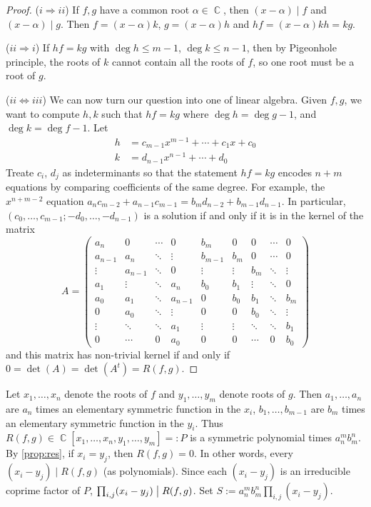 \documentclass[11pt, a4paper]{memoir}
\DeclareMathOperator{\C}{{\mathbb{C}}}
\newcommand{\imp}[2]{($#1\Rightarrow#2$)\hspace{0.2cm}}
\newcommand{\impe}[2]{($#1\Leftrightarrow#2$)\hspace{0.2cm}}
\renewcommand{\div}{\bigm|}
\theoremstyle{change}
\theoremstyle{plain}
\theoremstyle{nonumberplain}
\newtheorem{proof}{Proof}
\numberwithin{equation}{section}
\begin{document}
\begin{proof}
    \imp{i}{ii} If $f,g$ have a common root $\alpha\in\C$, then $(x-\alpha)\mid f$ and $(x-\alpha)\mid g$.
    Then $f=(x-\alpha)k$, $g=(x-\alpha)h$ and $hf=(x-\alpha)kh=kg$.

    \imp{ii}{i} If $hf=kg$ with $\deg h\leq m-1$, $\deg k\leq n-1$, then by Pigeonhole principle, the roots of $k$ cannot contain all the roots of $f$, so one root must be a root of $g$.

    \impe{ii}{iii} We can now turn our question into one of linear algebra.
    Given $f,g$, we want to compute $h,k$ such that $hf=kg$ where $\deg h=\deg g-1$, and $\deg k =\deg f-1$.
    Let
    \begin{align*}
        h&=c_{m-1}x^{m-1}+\cdots+c_1x+c_0\\
        k&=d_{n-1}x^{n-1}+\cdots+d_0
    \end{align*}
    Treate $c_i$, $d_j$ as indeterminants so that the statement $hf=kg$ encodes $n+m$ equations by comparing coefficients of the same degree.
    For example, the $x^{n+m-2}$ equation $a_nc_{m-2}+a_{n-1}c_{m-1}=b_md_{n-2}+b_{m-1}d_{n-1}$.
    In particular, $(c_0,\ldots,c_{m-1};-d_0,\ldots,-d_{n-1})$ is a solution if and only if it is in the kernel of the matrix
    \begin{equation*}
        A=
        \begin{pmatrix}
            a_n&0&\cdots&0&b_m&0&0&\cdots&0\\
            a_{n-1}&a_n&\ddots&\vdots&b_{m-1}&b_m&0&\cdots&0\\
            \vdots&a_{n-1}&\ddots&0&\vdots&\vdots&b_m&\ddots&\vdots\\
            a_1&\vdots&\ddots&a_n&b_0&b_1&\vdots&\ddots&0\\
            a_0&a_1&\ddots&a_{n-1}&0&b_0&b_1&\ddots&b_m\\
            0&a_0&\ddots&\vdots&0&0&b_0&\ddots&\vdots\\
            \vdots&\ddots&\ddots&a_1&\vdots&\vdots&\ddots&\ddots&b_1\\
            0&\cdots&0&a_0&0&0&\cdots&0&b_0
        \end{pmatrix}
    \end{equation*}
    and this matrix has non-trivial kernel if and only if $0=\det(A)=\det(A^t)=R(f,g)$.
\end{proof}
Let $x_1,\ldots,x_n$ denote the roots of $f$ and $y_1,\ldots,y_m$ denote roots of $g$.
Then $a_1,\ldots,a_n$ are $a_n$ times an elementary symmetric function in the $x_i$, $b_1,\ldots,b_{m-1}$ are $b_m$ times an elementary symmetric function in the $y_i$.
Thus $R(f,g)\in \C[x_1,\ldots,x_n,y_1,\ldots,y_m]=:P$ is a symmetric polynomial times $a_n^mb_m^n$.
By \cref{prop:res}, if $x_i=y_j$, then $R(f,g)=0$.
In other words, every $(x_i-y_j)\mid R(f,g)$ (as polynomials).
Since each $(x_i-y_j)$ is an irreducible coprime factor of $P$, $\prod_{i,j}(x_i-y_j)\div R(f,g)$.
Set $S:=a_n^mb_m^n\prod_{i,j}(x_i-y_j)$.
\end{document}
